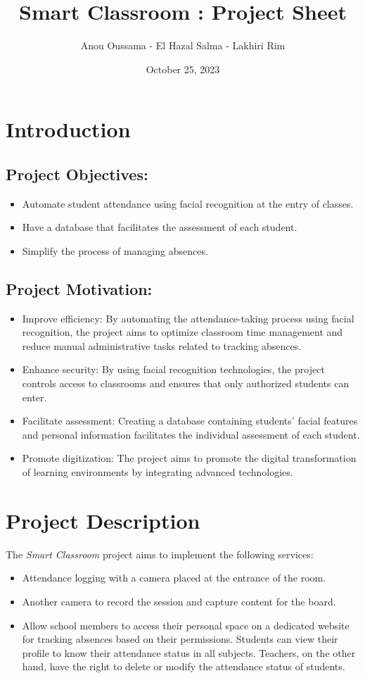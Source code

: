 \documentclass[11pt]{article}
\title{\textbf{Smart Classroom : Project Sheet}}
\author{Anou Oussama - El Hazal Salma - Lakhiri Rim}
\date{October 25, 2023}
\begin{document}
	

	\maketitle
	\section{Introduction}
	
	\subsection*{Project Objectives:}
	\begin{itemize}
		\item Automate student attendance using facial recognition at the entry of classes.
		\item Have a database that facilitates the assessment of each student.
		\item Simplify the process of managing absences.
	\end{itemize}
	
	\subsection*{Project Motivation:}
	\begin{itemize}
		\item Improve efficiency: By automating the attendance-taking process using facial recognition, the project aims to optimize classroom time management and reduce manual administrative tasks related to tracking absences.
		\item Enhance security: By using facial recognition technologies, the project controls access to classrooms and ensures that only authorized students can enter.
		\item Facilitate assessment: Creating a database containing students' facial features and personal information facilitates the individual assessment of each student.
		\item Promote digitization: The project aims to promote the digital transformation of learning environments by integrating advanced technologies.
	\end{itemize}
	
	\section{Project Description}
	The \textit{Smart Classroom} project aims to implement the following services:
	\begin{itemize}
		\item Attendance logging with a camera placed at the entrance of the room.
		\item Another camera to record the session and capture content for the board.
		\item Allow school members to access their personal space on a dedicated website for tracking absences based on their permissions. Students can view their profile to know their attendance status in all subjects. Teachers, on the other hand, have the right to delete or modify the attendance status of students.
	\end{itemize}
	
\end{document}
